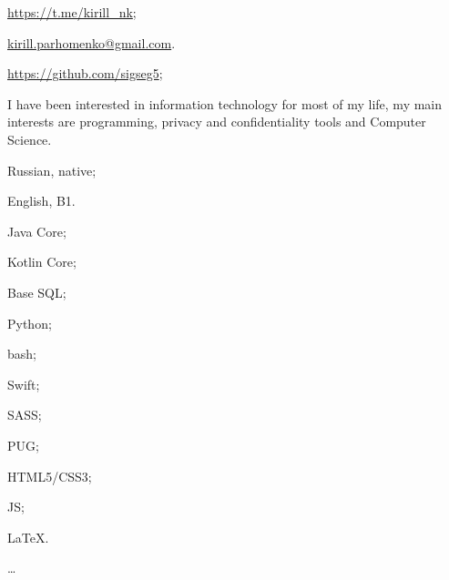 \normalsize\normalfont
\SmallSep


\begin{multicols}{2}
	\begin{compactitem}[\color{Cyan}$\circ$]
		\item\small \url{https://t.me/kirill_nk};
		\item\small \href{mailto:kirill.parhomenko@gmail.com}{kirill.parhomenko@gmail.com}.
		\item\small \url{https://github.com/sigseg5};
	\end{compactitem}
\end{multicols}

\SmallSep



I have been interested in information technology for most of my life, my main interests are programming, privacy and confidentiality tools and Computer Science.

\Sep




\begin{multicols}{3}
	\begin{compactitem}[\color{Cyan}$\circ$]
		\item Russian, native;
		\item English, B1.
	\end{compactitem}
\end{multicols}

\SmallSep

\begin{multicols}{3}
	\begin{compactitem}[\color{Cyan}$\circ$]
		\item Java Core;
		\item Kotlin Core;
		\item Base SQL;
		\item Python;
		\item bash;
		\item Swift;
		\item SASS;
		\item PUG;
		\item HTML5/CSS3;
		\item JS;
		\item \LaTeX.
		\item \ldots
	\end{compactitem}
\end{multicols}

